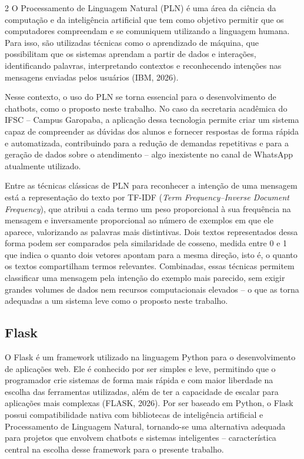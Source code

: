\documentclass[10pt]{article}
\begin{document}
\begin{multicols}{2}
O Processamento de Linguagem Natural (PLN) é uma área da ciência da
computação e da inteligência artificial que tem como objetivo permitir
que os computadores compreendam e se comuniquem utilizando a linguagem
humana. Para isso, são utilizadas técnicas como o aprendizado de máquina,
que possibilitam que os sistemas aprendam a partir de dados e interações,
identificando palavras, interpretando contextos e reconhecendo intenções
nas mensagens enviadas pelos usuários (IBM, 2026).

Nesse contexto, o uso do PLN se torna essencial para o desenvolvimento de
chatbots, como o proposto neste trabalho. No caso da secretaria acadêmica
do IFSC -- Campus Garopaba, a aplicação dessa tecnologia permite criar um
sistema capaz de compreender as dúvidas dos alunos e fornecer respostas
de forma rápida e automatizada, contribuindo para a redução de demandas
repetitivas e para a geração de dados sobre o atendimento -- algo
inexistente no canal de WhatsApp atualmente utilizado.

Entre as técnicas clássicas de PLN para reconhecer a intenção de uma
mensagem está a representação do texto por TF-IDF (\textit{Term
Frequency--Inverse Document Frequency}), que atribui a cada termo um peso
proporcional à sua frequência na mensagem e inversamente proporcional ao
número de exemplos em que ele aparece, valorizando as palavras mais
distintivas. Dois textos representados dessa forma podem ser comparados
pela similaridade de cosseno, medida entre 0 e 1 que indica o quanto dois
vetores apontam para a mesma direção, isto é, o quanto os textos
compartilham termos relevantes. Combinadas, essas técnicas permitem
classificar uma mensagem pela intenção do exemplo mais parecido, sem
exigir grandes volumes de dados nem recursos computacionais elevados -- o
que as torna adequadas a um sistema leve como o proposto neste trabalho.

\subsection{Flask}\label{sec:flask}

O Flask é um framework utilizado na linguagem Python para o
desenvolvimento de aplicações web. Ele é conhecido por ser simples e
leve, permitindo que o programador crie sistemas de forma mais rápida e
com maior liberdade na escolha das ferramentas utilizadas, além de ter a
capacidade de escalar para aplicações mais complexas (FLASK, 2026). Por
ser baseado em Python, o Flask possui compatibilidade nativa com
bibliotecas de inteligência artificial e Processamento de Linguagem
Natural, tornando-se uma alternativa adequada para projetos que envolvem
chatbots e sistemas inteligentes -- característica central na escolha
desse framework para o presente trabalho.


\end{multicols}
\end{document}
